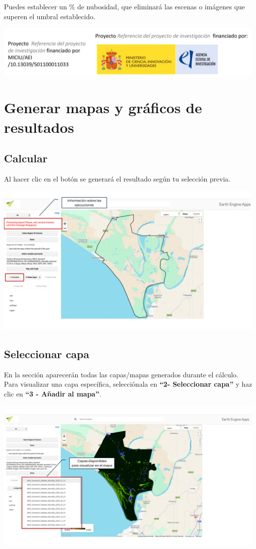 \documentclass[
]{book}
\begin{document}
Puedes establecer un \% de nubosidad, que eliminará las escenas o imágenes que superen el umbral establecido.

\includegraphics{assets/logo.jpeg}

\chapter{Generar mapas y gráficos de resultados}\label{mapas-graficos}

\section{\texorpdfstring{\textbf{Calcular}}{Calcular}}\label{calcular}

Al hacer clic en el botón se generará el resultado según tu selección previa.

\includegraphics{assets/message_es.png}

\section{\texorpdfstring{\textbf{Seleccionar capa}}{Seleccionar capa}}\label{seleccionar-capa}

En la sección aparecerán todas las capas/mapas generados durante el cálculo. Para visualizar una capa específica, selecciónala en \textbf{``2- Seleccionar capa''} y haz clic en \textbf{``3 - Añadir al mapa''}.

\includegraphics{assets/layers_es.png}
\end{document}
